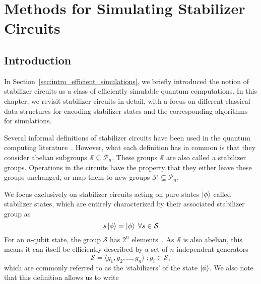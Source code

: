 
\chapter[Methods for Simulating Stabilizer Circuits]{Methods for Simulating Stabilizer\\ Circuits}
\label{chap:stabilizers}

\section{Introduction}\label{sec:stabilizer-intro}
In Section~\ref{sec:intro_efficient_simulations}, we briefly introduced the notion of stabilizer circuits as a class of efficiently simulable quantum computations. In this chapter, we revisit stabilizer circuits in detail, with a focus on different classical data structures for encoding stabilizer states and the corresponding algorithms for simulations.\par
Several informal definitions of stabilizer circuits have been used in the quantum computing literature~\cite{Gottesman1998b,Aaronson2004,VandenNest2008,Seddon2019}. However, what each definition has in common is that they consider abelian subgroups $\mathcal{S} \subseteq \mathcal{P}_{n}$. These groups $\mathcal{S}$ are also called a stabilizer groups. Operations in the circuits have the property that they either leave these groups unchanged, or map them to new groups $\mathcal{S'}\subseteq \mathcal{P}_{n}$.\par
We focus exclusively on stabilizer circuits acting on pure states $\ket{\phi}$ called stabilizer states, which are entirely characterized by their associated stabilizer group as
\begin{equation}
    s\ket{\phi}=\ket{\phi}\;\forall s\in\mathcal{S}
\end{equation}
For an $n$-qubit state, the group $\mathcal{S}$ has $2^{n}$ elements~\cite{Gottesman1998b}. As $\mathcal{S}$ is also abelian, this means it can itself be efficiently described by a set of $n$ independent generators
\begin{equation}
    \mathcal{S} = \langle g_{1}, g_{2},\dots,g_{n}\rangle \; : g_{i}\in\mathcal{S},
\end{equation}
which are commonly referred to as the `stabilizers' of the state $\ket{\phi}$. We also note that this definition allows us to write
